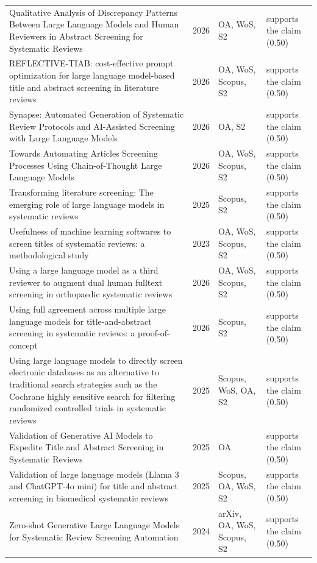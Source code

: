 \begin{longtable}{@{}%
  >{\raggedright\arraybackslash}p{}c%
  >{\raggedright\arraybackslash}p{}%
  >{\raggedright\arraybackslash}p{}@{}}
Qualitative Analysis of Discrepancy Patterns Between Large Language Models and Human Reviewers in Abstract Screening for Systematic Reviews & 2026 & OA, WoS, S2 & supports the claim (0.50) \\
REFLECTIVE-TIAB: cost-effective prompt optimization for large language model-based title and abstract screening in literature reviews & 2026 & OA, WoS, Scopus, S2 & supports the claim (0.50) \\
Synapse: Automated Generation of Systematic Review Protocols and AI-Assisted Screening with Large Language Models & 2026 & OA, S2 & supports the claim (0.50) \\
Towards Automating Articles Screening Processes Using Chain-of-Thought Large Language Models & 2026 & OA, WoS, Scopus, S2 & supports the claim (0.50) \\
Transforming literature screening: The emerging role of large language models in systematic reviews & 2025 & Scopus, S2 & supports the claim (0.50) \\
Usefulness of machine learning softwares to screen titles of systematic reviews: a methodological study & 2023 & OA, WoS, Scopus, S2 & supports the claim (0.50) \\
Using a large language model as a third reviewer to augment dual human fulltext screening in orthopaedic systematic reviews & 2026 & OA, WoS, Scopus, S2 & supports the claim (0.50) \\
Using full agreement across multiple large language models for title-and-abstract screening in systematic reviews: a proof-of-concept & 2026 & Scopus, S2 & supports the claim (0.50) \\
Using large language models to directly screen electronic databases as an alternative to traditional search strategies such as the Cochrane highly sensitive search for filtering randomized controlled trials in systematic reviews & 2025 & Scopus, WoS, OA, S2 & supports the claim (0.50) \\
Validation of Generative AI Models to Expedite Title and Abstract Screening in Systematic Reviews & 2025 & OA & supports the claim (0.50) \\
Validation of large language models (Llama 3 and ChatGPT-4o mini) for title and abstract screening in biomedical systematic reviews & 2025 & Scopus, OA, WoS, S2 & supports the claim (0.50) \\
Zero-shot Generative Large Language Models for Systematic Review Screening Automation & 2024 & arXiv, OA, WoS, Scopus, S2 & supports the claim (0.50) \\

\end{longtable}
